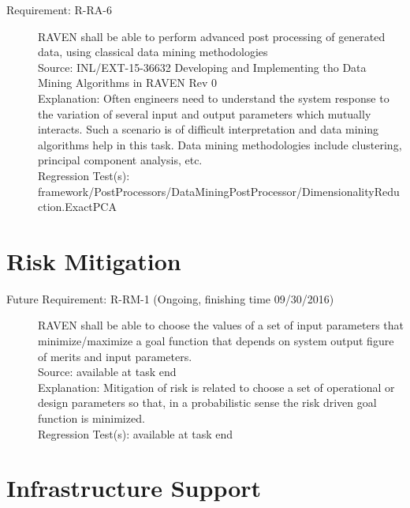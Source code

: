 \documentclass{article}
\newcommand{\requirement}[5]{\item[Requirement: #1] #2 \\Source: #3\\Explanation: #4\\Regression Test(s): #5}
\newcommand{\futurerequirement}[6]{\item[Future Requirement: #1 #6] #2 \\Source: #3\\Explanation: #4\\Regression Test(s): #5}
\begin{document}
\begin{description}
\requirement{R-RA-6}{RAVEN shall be able to perform advanced post processing of generated data, using classical data mining methodologies}
{INL/EXT-15-36632 Developing and Implementing tho Data Mining Algorithms in RAVEN Rev 0}
{Often engineers need to understand the system response to the variation of several input and output parameters which mutually interacts. Such a scenario is of difficult interpretation and data mining algorithms help in this task.  Data mining methodologies include clustering, principal component analysis, etc.}
{framework/PostProcessors/DataMiningPostProcessor/DimensionalityReduction.ExactPCA}


\end{description}

\section{Risk Mitigation}

\begin{description}

\futurerequirement{R-RM-1}{RAVEN shall be able to choose the values of a set of input parameters that minimize/maximize a goal function that depends on system output figure of merits and input parameters.}
{available at task end}
{Mitigation of risk is related to choose a set of operational or design parameters so that, in a probabilistic sense the risk driven goal function is minimized.}
{available at task end}
{(Ongoing, finishing time 09/30/2016)}
\end{description}

\section{Infrastructure Support}
\end{document}
